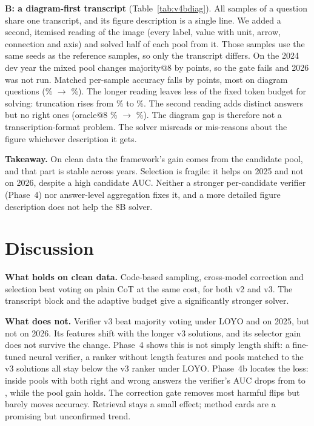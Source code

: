 \documentclass[conference]{IEEEtran}
\begin{document}
\textbf{B: a diagram-first transcript} (Table~\ref{tab:v4bdiag}). All samples of a question share
one transcript, and its figure description is a single line. We added a second, itemised reading
of the image (every label, value with unit, arrow, connection and axis) and solved half of each
pool from it. Those samples use the same seeds as the reference samples, so only the transcript
differs. On the 2024 dev year the mixed pool changes majority@8 by \VbBMaj{} points, so the gate
fails and 2026 was not run. Matched per-sample accuracy falls by \VbBSample{} points, most on
diagram questions (\VbBImgCur\% $\to$ \VbBImgDiag\%). The longer reading leaves less of the fixed
token budget for solving: truncation rises from \VbBTrCur\% to \VbBTrDiag\%. The second reading
adds distinct answers but no right ones (oracle@8 \VbBOrcRef\% $\to$ \VbBOrcMulti\%). The diagram
gap is therefore not a transcription-format problem. The solver misreads or mis-reasons about the
figure whichever description it gets.

\textbf{Takeaway.} On clean data the framework's gain comes from the candidate pool, and that part
is stable across years. Selection is fragile: it helps on 2025 and not on 2026, despite a high
candidate AUC. Neither a stronger per-candidate verifier (Phase~4) nor answer-level aggregation
fixes it, and a more detailed figure description does not help the 8B solver.

\section{Discussion}
\textbf{What holds on clean data.} Code-based sampling, cross-model correction and selection beat
voting on plain CoT at the same cost, for both v2 and v3. The transcript block and the adaptive
budget give a significantly stronger solver.

\textbf{What does not.} Verifier v3 beat majority voting under LOYO and on 2025, but not on 2026.
Its features shift with the longer v3 solutions, and its selector gain does not survive the
change. Phase~4 shows this is not simply length shift: a fine-tuned neural verifier, a ranker
without length features and pools matched to the v3 solutions all stay below the v3 ranker under
LOYO. Phase~4b locates the loss: inside pools with both right and wrong answers the verifier's
AUC drops from \VbAucInTwentyFive{} to \VbAucInTwentySix, while the pool gain holds. The
correction gate removes most harmful flips but barely moves accuracy. Retrieval stays a
small effect; method cards are a promising but unconfirmed trend.
\end{document}
